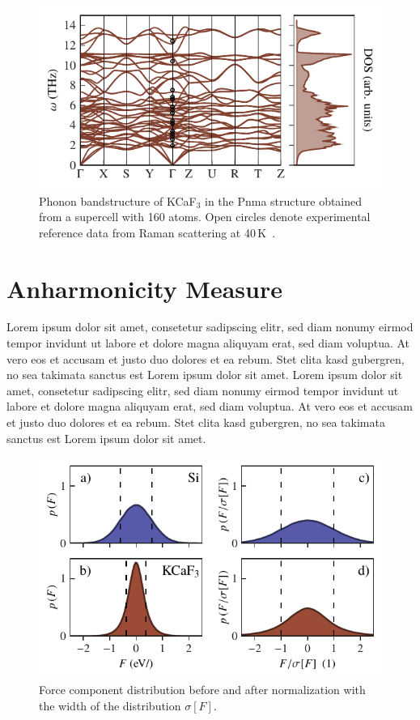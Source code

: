 \begin{figure}
	\includegraphics[width=\textwidth]{./data/plots/anharmonicity/3_bandstructures/KCaF3/bands_dos_emb.pdf}
	\caption{
		Phonon bandstructure of KCaF$_3$ in the Pnma structure obtained from a supercell with 160 atoms. Open circles denote experimental reference data from Raman scattering at 40\,K~\cite{Daniel1997}.
	}
\end{figure}


\section{Anharmonicity Measure}

Lorem ipsum dolor sit amet, consetetur sadipscing elitr, sed diam nonumy eirmod tempor invidunt ut labore et dolore magna aliquyam erat, sed diam voluptua. At vero eos et accusam et justo duo dolores et ea rebum. Stet clita kasd gubergren, no sea takimata sanctus est Lorem ipsum dolor sit amet. Lorem ipsum dolor sit amet, consetetur sadipscing elitr, sed diam nonumy eirmod tempor invidunt ut labore et dolore magna aliquyam erat, sed diam voluptua. At vero eos et accusam et justo duo dolores et ea rebum. Stet clita kasd gubergren, no sea takimata sanctus est Lorem ipsum dolor sit amet.

\begin{figure}
	\includegraphics[width=\textwidth]{./data/plots/anharmonicity/4_force_distribution/histogram_forces.pdf}
	\caption{
		Force component distribution before and after normalization with the width of the distribution $\sigma [F]$.
	}
\end{figure}


